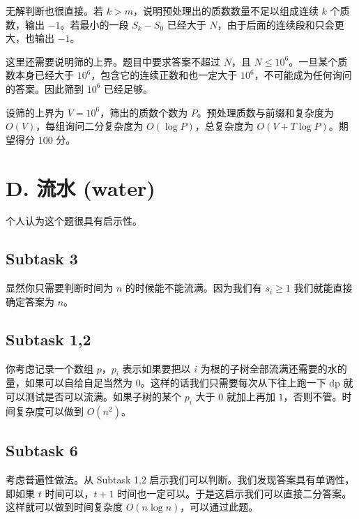 \documentclass[12pt]{ctexart}  %
\begin{document}
无解判断也很直接。若 $k>m$，说明预处理出的质数数量不足以组成连续 $k$ 个质数，输出 $-1$。若最小的一段 $S_k-S_0$ 已经大于 $N$，由于后面的连续段和只会更大，也输出 $-1$。

这里还需要说明筛的上界。题目中要求答案不超过 $N$，且 $N\le 10^6$。一旦某个质数本身已经大于 $10^6$，包含它的连续正数和也一定大于 $10^6$，不可能成为任何询问的答案。因此筛到 $10^6$ 已经足够。

设筛的上界为 $V=10^6$，筛出的质数个数为 $P$。预处理质数与前缀和复杂度为 $O(V)$，每组询问二分复杂度为 $O(\log P)$，总复杂度为 $O(V+T\log P)$。期望得分 100 分。



\section{D. 流水 (water)}

个人认为这个题很具有启示性。

\subsection{Subtask 3}

显然你只需要判断时间为 $n$ 的时候能不能流满。因为我们有 $s_i \ge 1$ 我们就能直接确定答案为 $n$。

\subsection{Subtask 1,2}

你考虑记录一个数组 $p$，$p_i$ 表示如果要把以 $i$ 为根的子树全部流满还需要的水的量，如果可以自给自足当然为 $0$。这样的话我们只需要每次从下往上跑一下 dp 就可以测试是否可以流满。如果子树的某个 $p_i$ 大于 $0$ 就加上再加 $1$，否则不管。时间复杂度可以做到 $O(n^2)$。

\subsection{Subtask 6}

考虑普遍性做法。从 Subtask 1,2 启示我们可以判断。我们发现答案具有单调性，即如果 $t$ 时间可以，$t+1$ 时间也一定可以。于是这启示我们可以直接二分答案。这样就可以做到时间复杂度 $O(n \log n)$，可以通过此题。
\end{document}
